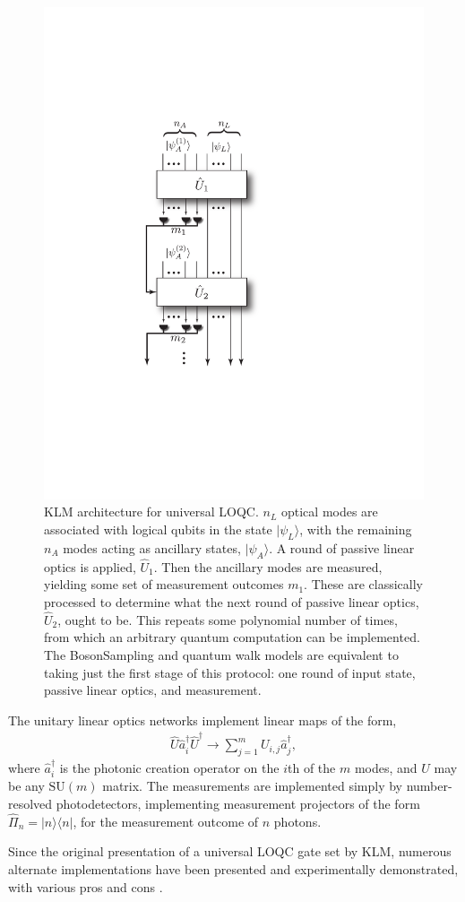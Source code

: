 \documentclass[aps,rmp,twocolumn,amsmath,amssymb,nofootinbib,superscriptaddress,longbibliography,floatfix]{revtex4-1}
\newcommand{\bra}[1]{\langle#1|}
\newcommand{\ket}[1]{|#1\rangle}
\begin{document}
\begin{figure}[!htb]
\includegraphics[width=0.5\columnwidth]{KLM}
\caption{KLM architecture for universal LOQC. $n_L$ optical modes are associated with logical qubits in the state $\ket{\psi_L}$, with the remaining $n_A$ modes acting as ancillary states, $\ket{\psi_A}$. A round of passive linear optics is applied, $\hat{U}_1$. Then the ancillary modes are measured, yielding some set of measurement outcomes $m_1$. These are classically processed to determine what the next round of passive linear optics, $\hat{U}_2$, ought to be. This repeats some polynomial number of times, from which an arbitrary quantum computation can be implemented. The {\sc BosonSampling} and quantum walk models are equivalent to taking just the first stage of this protocol: one round of input state, passive linear optics, and measurement.} \label{fig:KLM_protocol}
\end{figure}

The unitary linear optics networks implement linear maps of the form,
\begin{align}
\hat{U}\hat{a}_i^\dag \hat{U}^\dag \to \sum_{j=1}^m U_{i,j} \hat{a}^\dag_j,
\end{align}
where $\hat{a}^\dag_i$ is the photonic creation operator on the $i$th of the $m$ modes, and $U$ may be any $\mathrm{SU}(m)$ matrix. The measurements are implemented simply by number-resolved photodetectors, implementing measurement projectors of the form \mbox{$\hat\Pi_n=\ket{n}\bra{n}$}, for the measurement outcome of $n$ photons.

Since the original presentation of a universal LOQC gate set by KLM, numerous alternate implementations have been presented and experimentally demonstrated, with various pros and cons \cite{bib:Ralph01, bib:Pittman01, bib:Ralph02, bib:Knill02, bib:Pittman03, bib:MorYoran06}.
\end{document}
